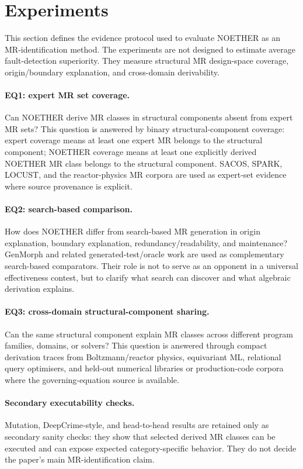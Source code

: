\documentclass[acmsmall,screen,review]{acmart}
\begin{document}
\section{Experiments}
\label{sec:experiments}

This section defines the evidence protocol used to evaluate NOETHER as an MR-identification method. The experiments are not designed to estimate average fault-detection superiority. They measure structural MR design-space coverage, origin/boundary explanation, and cross-domain derivability.

\paragraph{EQ1: expert MR set coverage.}
Can NOETHER derive MR classes in structural components absent from expert MR sets? This question is answered by binary structural-component coverage: expert coverage means at least one expert MR belongs to the structural component; NOETHER coverage means at least one explicitly derived NOETHER MR class belongs to the structural component. SACOS, SPARK, LOCUST, and the reactor-physics MR corpora are used as expert-set evidence where source provenance is explicit.

\paragraph{EQ2: search-based comparison.}
How does NOETHER differ from search-based MR generation in origin explanation, boundary explanation, redundancy/readability, and maintenance? GenMorph and related generated-test/oracle work are used as complementary search-based comparators. Their role is not to serve as an opponent in a universal effectiveness contest, but to clarify what search can discover and what algebraic derivation explains.

\paragraph{EQ3: cross-domain structural-component sharing.}
Can the same structural component explain MR classes across different program families, domains, or solvers? This question is answered through compact derivation traces from Boltzmann/reactor physics, equivariant ML, relational query optimisers, and held-out numerical libraries or production-code corpora where the governing-equation source is available.

\paragraph{Secondary executability checks.}
Mutation, DeepCrime-style, and head-to-head results are retained only as secondary sanity checks: they show that selected derived MR classes can be executed and can expose expected category-specific behavior. They do not decide the paper's main MR-identification claim.
\end{document}
